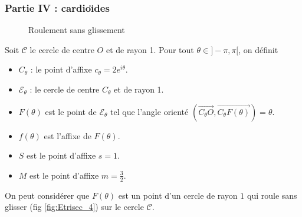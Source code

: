 \subsubsection*{Partie IV : cardio{\"\i}des}
\begin{figure}[ht]
  \centering
  
  \caption{Roulement sans glissement}
  \label{fig:Etrisec_5}
\end{figure}
Soit $\mathcal{C}$ le cercle de centre $O$ et de rayon 1. Pour tout $\theta \in ]-\pi, \pi[$, on d{\'e}finit
\begin{itemize}
  \item $C_\theta$ : le point d'affixe $c_\theta=2e^{i\theta}$.
  \item $\mathcal{E}_\theta$ : le cercle de centre $C_\theta$ et
  de rayon 1.
  \item $F(\theta)$ est le point de $\mathcal{E}_\theta$ tel que l'angle orient{\'e} $(\overrightarrow{C_\theta O},\overrightarrow{C_\theta F(\theta)})=\theta$.
  \item $f(\theta)$ est l'affixe de $F(\theta)$.
  \item $S$ est le point d'affixe $s=1$.
  \item $M$ est le point d'affixe $m=\frac{3}{2}$.
\end{itemize}
On peut considérer que $F(\theta)$ est un point d'un cercle de rayon $1$ qui roule sans glisser (fig \ref{fig:Etrisec_4}) sur le cercle $\mathcal C$. 
